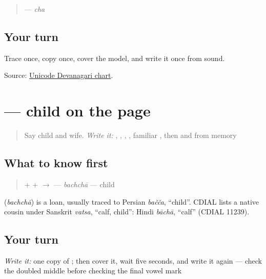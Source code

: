 \begin{quote}
\textbf{} — \emph{cha}
\end{quote}

\subsection*{Your turn}
Trace once, copy once, cover the model, and write it once from sound.

\begin{tcolorbox}[breakable,colback=teal!4,colframe=teal!35!black,title={Before you move on}]
Source: \href{https://www.unicode.org/charts/PDF/U0900.pdf}{Unicode Devanagari chart}.
\end{tcolorbox}
\section[\texorpdfstring{\mw{बच्चा} (bachchā)}{बच्चा (bachchā)}]{ — child on the page}

\label{lesson:MW-C09-bachcha}



\begin{quote}
Say child and wife. \emph{Write it:} \textbf{}, \textbf{}, \textbf{}, \textbf{}, familiar \textbf{}, then \textbf{} and \textbf{} from memory
\end{quote}

\subsection*{What to know first}
\begin{quote}
\textbf{} + \textbf{} + \textbf{} $\to$ \textbf{} — \emph{bachchā} — child
\end{quote}

\begin{cousinweb}
\textbf{} (\emph{bachchā}) is a loan, usually traced to Persian \emph{bačča}, \textquotedblleft{}child\textquotedblright{}. CDIAL lists a native cousin under Sanskrit \emph{vatsa}, \textquotedblleft{}calf, child\textquotedblright{}: Hindi \emph{bāchā}, \textquotedblleft{}calf\textquotedblright{} (CDIAL 11239).
\end{cousinweb}

\subsection*{Your turn}
\emph{Write it:} one copy of \textbf{}; then cover it, wait five seconds, and write it again — check the doubled middle before checking the final vowel mark

